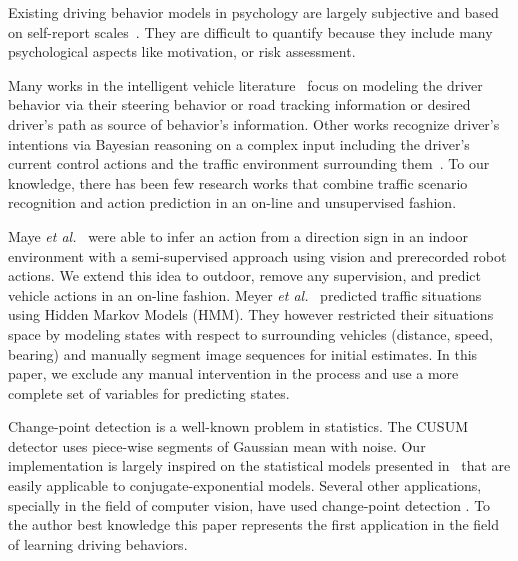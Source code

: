 Existing driving behavior models in psychology are largely subjective and based
on self-report scales~\cite{ranney94models}. They are difficult to quantify
because they include many psychological aspects like motivation, or risk
assessment.

Many works in the intelligent vehicle
literature~\cite{donges78two,mcruer80human,hess90control,macadam81application}
focus on modeling the driver behavior via their steering behavior or road
tracking information or desired driver's path as source of behavior's
information. Other works recognize driver's intentions via Bayesian reasoning on
a complex input including the driver's current control actions and the traffic
environment surrounding them~\cite{oliver00graphical,liu01modeling}. To our
knowledge, there has been few research works that combine traffic scenario
recognition and action prediction in an on-line and unsupervised fashion.

Maye \emph{et al.}~\cite{maye10inferring} were able to infer an action from a
direction sign in an indoor environment with a semi-supervised approach
using vision and prerecorded robot actions. We extend this idea to outdoor,
remove any supervision, and predict vehicle actions in an on-line fashion.
Meyer \emph{et al.}~\cite{meyer09probabilistic} predicted traffic situations
using Hidden Markov Models (HMM). They however restricted their situations space
by modeling states with respect to surrounding vehicles (distance, speed,
bearing) and manually segment image sequences for initial estimates. In this
paper, we exclude any manual intervention in the process and use a more complete
set of variables for predicting states.

Change-point detection is a well-known problem in statistics. The CUSUM detector
\cite{page54continuous} uses piece-wise segments of Gaussian mean with noise.
Our implementation is largely inspired on the statistical models presented
in~\cite{adams07bayesian,fearnhead07online} that are easily applicable to
conjugate-exponential models. Several other applications, specially in the field
of computer vision, have used change-point detection
\cite{zhai05general,cemgil05hybrid}. To the author best knowledge this paper
represents the first application in the field of learning driving behaviors.
